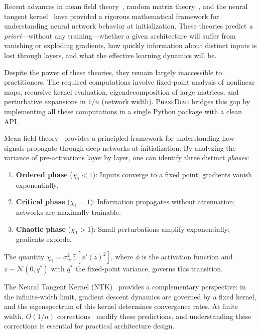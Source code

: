 \documentclass[10pt]{article}
\theoremstyle{definition}
\begin{document}
Recent advances in mean field theory~\citep{poole2016exponential,schoenholz2017deep}, random matrix theory~\citep{pennington2017nonlinear,pennington2018emergence}, and the neural tangent kernel~\citep{jacot2018neural} have provided a rigorous mathematical framework for understanding neural network behavior at initialization.
These theories predict \emph{a priori}---without any training---whether a given architecture will suffer from vanishing or exploding gradients, how quickly information about distinct inputs is lost through layers, and what the effective learning dynamics will be.

Despite the power of these theories, they remain largely inaccessible to practitioners.
The required computations involve fixed-point analysis of nonlinear maps, recursive kernel evaluation, eigendecomposition of large matrices, and perturbative expansions in $1/n$ (network width).
\textsc{PhaseDiag} bridges this gap by implementing all these computations in a single Python package with a clean API.

Mean field theory~\citep{poole2016exponential,schoenholz2017deep} provides a principled framework for understanding how signals propagate through deep networks at initialization.
By analyzing the variance of pre-activations layer by layer, one can identify three distinct \emph{phases}:
\begin{enumerate}[nosep]
  \item \textbf{Ordered phase} ($\chi_1 < 1$): Inputs converge to a fixed point; gradients vanish exponentially.
  \item \textbf{Critical phase} ($\chi_1 = 1$): Information propagates without attenuation; networks are maximally trainable.
  \item \textbf{Chaotic phase} ($\chi_1 > 1$): Small perturbations amplify exponentially; gradients explode.
\end{enumerate}
The quantity $\chi_1 = \sigma_w^2 \, \mathbb{E}[\phi'(z)^2]$, where $\phi$ is the activation function and $z \sim \mathcal{N}(0, q^*)$ with $q^*$ the fixed-point variance, governs this transition.

The Neural Tangent Kernel (NTK)~\citep{jacot2018neural} provides a complementary perspective: in the infinite-width limit, gradient descent dynamics are governed by a fixed kernel, and the eigenspectrum of this kernel determines convergence rates.
At finite width, $O(1/n)$ corrections~\citep{dyer2020asymptotics,huang2020dynamics} modify these predictions, and understanding these corrections is essential for practical architecture design.
\end{document}
